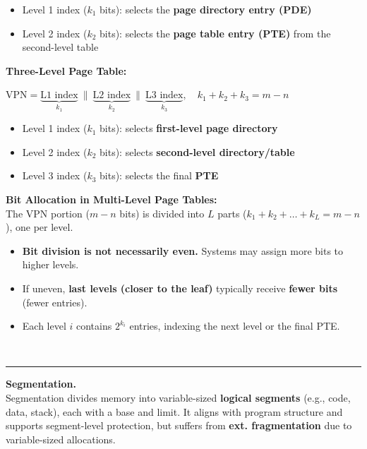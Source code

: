 \documentclass[8pt]{extarticle}
\begin{document}
\begin{minipage}[htp]{0.48\textwidth}
\begin{minipage}[htp]{1\textwidth}
\begin{itemize}[noitemsep,topsep=0pt]
        \item Level 1 index ($k_1$ bits): selects the \textbf{page directory entry (PDE)}
        \item Level 2 index ($k_2$ bits): selects the \textbf{page table entry (PTE)} from the second-level table
    \end{itemize}
\vspace{5px}
    \noindent\textbf{Three-Level Page Table:}
\begin{center}$
    \text{VPN} = \underbrace{\text{L1 index}}_{k_1} \ \|\ \underbrace{\text{L2 index}}_{k_2} \ \|\ \underbrace{\text{L3 index}}_{k_3}, \quad k_1 + k_2 + k_3 = m - n
$\end{center}\vspace{-10px}
    \begin{itemize}[noitemsep,topsep=0pt]
        \item Level 1 index ($k_1$ bits): selects \textbf{first-level page directory}
        \item Level 2 index ($k_2$ bits): selects \textbf{second-level directory/table}
        \item Level 3 index ($k_3$ bits): selects the final \textbf{PTE}
    \end{itemize}

    \noindent\textbf{Bit Allocation in Multi-Level Page Tables:} \\
    The VPN portion ($m - n$ bits) is divided into $L$ parts ($k_1 + k_2 + \dots + k_L = m - n$), one per level.
    \begin{itemize}[noitemsep,topsep=0pt]
        \item \textbf{Bit division is not necessarily even.} Systems may assign more bits to higher levels.
        \item If uneven, \textbf{last levels (closer to the leaf)} typically receive \textbf{fewer bits} (fewer entries).
        \item Each level $i$ contains $2^{k_i}$ entries, indexing the next level or the final PTE.
    \end{itemize}
\end{minipage}\\[3px]
\hrule
\vspace{3px}
\noindent\textbf{Segmentation.} \\
Segmentation divides memory into variable-sized \textbf{logical segments} (e.g., code, data, stack), each with a base and limit. It aligns with program structure and supports segment-level protection, but suffers from \textbf{ext. fragmentation} due to variable-sized allocations.
\end{minipage}
\end{document}
